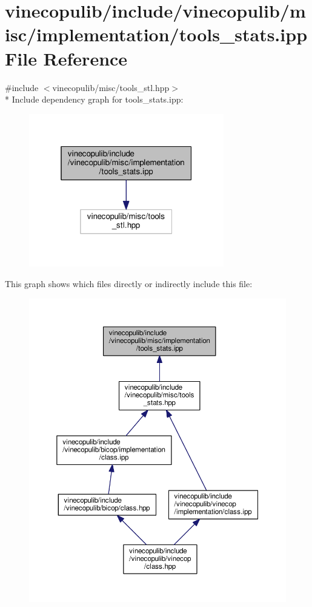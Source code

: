 \hypertarget{tools__stats_8ipp}{}\section{vinecopulib/include/vinecopulib/misc/implementation/tools\+\_\+stats.ipp File Reference}
\label{tools__stats_8ipp}
{\ttfamily \#include $<$vinecopulib/misc/tools\+\_\+stl.\+hpp$>$}\\*
Include dependency graph for tools\+\_\+stats.\+ipp\+:\nopagebreak
\begin{figure}[H]
\begin{center}
\leavevmode
\includegraphics[width=241pt]{tools__stats_8ipp__incl}
\end{center}
\end{figure}
This graph shows which files directly or indirectly include this file\+:
\nopagebreak
\begin{figure}[H]
\begin{center}
\leavevmode
\includegraphics[width=350pt]{tools__stats_8ipp__dep__incl}
\end{center}
\end{figure}
